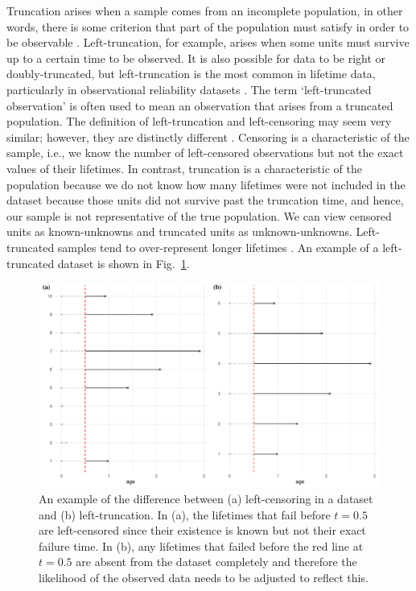 Truncation arises when a sample comes from an incomplete population, in other words, there is some criterion that part of the population must satisfy in order to be observable \citep{guo1993}. Left-truncation, for example, arises when some units must survive up to a certain time to be observed. It is also possible for data to be right or doubly-truncated, but left-truncation is the most common in lifetime data, particularly in observational reliability datasets \citep{Emura2022}. The term `left-truncated observation' is often used to mean an observation that arises from a truncated population. The definition of left-truncation and left-censoring may seem very similar; however, they are distinctly different \citep{mitra2013}. Censoring is a characteristic of the sample, i.e., we know the number of left-censored observations but not the exact values of their lifetimes. In contrast, truncation is a characteristic of the population because we do not know how many lifetimes were not included in the dataset because those units did not survive past the truncation time, and hence, our sample is not representative of the true population. We can view censored units as known-unknowns and truncated units as unknown-unknowns. Left-truncated samples tend to over-represent longer lifetimes \citep{guo1993}. An example of a left-truncated dataset is shown in Fig.~\ref{fig:left_trunc_example}.

\begin{figure}[h]
    \centering
    \includegraphics[width=1\textwidth]{./figures/ch-2/left_truncation_example.pdf}
    \caption{An example of the difference between (a) left-censoring in a dataset and (b) left-truncation. In (a), the lifetimes that fail before $t = 0.5$ are left-censored since their existence is known but not their exact failure time. In (b), any lifetimes that failed before the red line at $t = 0.5$ are absent from the dataset completely and therefore the likelihood of the observed data needs to be adjusted to reflect this.}
    \label{fig:left_trunc_example}
\end{figure}


